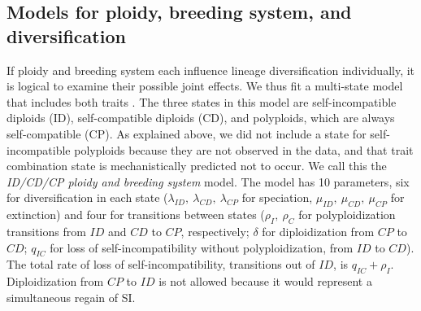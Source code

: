 
\subsection{Models for ploidy, breeding system, and diversification}

If ploidy and breeding system each influence lineage diversification individually, it is logical to examine their possible joint effects. %
We thus fit a multi-state model that includes both traits \citep[MuSSE,][]{fitzjohn_2012}.
The three states in this model are self-incompatible diploids (ID), self-compatible diploids (CD), and polyploids, which are always self-compatible (CP).
As explained above, we did not include a state for self-incompatible polyploids because they are not observed in the data, and   that trait combination state is mechanistically predicted not to occur.
We call this the \textit{ID/CD/CP ploidy and breeding system} model.
The model has 10 parameters, six for diversification in each state ($\lambda_{ID},\ \lambda_{CD},\ \lambda_{CP}$ for speciation, $\mu_{ID},\ \mu_{CD},\ \mu_{CP}$ for extinction) and four for transitions between states ($\rho_I,\ \rho_C$ for polyploidization transitions from $ID$ and $CD$ to $CP$, respectively; $\delta$ for diploidization from $CP$ to $CD$; $q_{IC}$ for loss of self-incompatibility without polyploidization, from $ID$ to $CD$).
The total rate of loss of self-incompatibility, \ie transitions out of $ID$, is $q_{IC} + \rho_I$.
Diploidization from $CP$ to $ID$ is not allowed because it would represent a simultaneous regain of SI.

